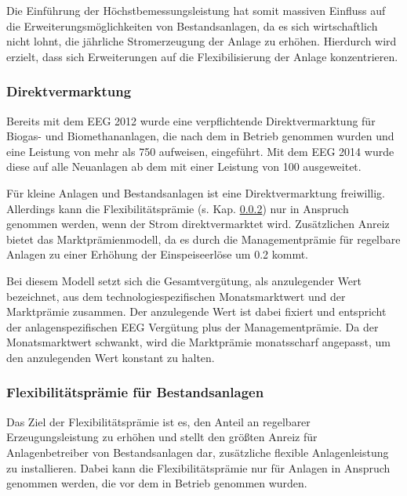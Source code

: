 Die Einführung der Höchstbemessungsleistung hat somit massiven Einfluss auf die Erweiterungsmöglichkeiten von Bestandsanlagen, da es sich wirtschaftlich nicht lohnt, die jährliche Stromerzeugung der Anlage zu erhöhen. Hierdurch wird erzielt, dass sich Erweiterungen auf die Flexibilisierung der Anlage konzentrieren. \parencite{DanielGromke2019}


\subsubsection{Direktvermarktung}\label{chap:law_DV}

Bereits mit dem \gls{EEG} \SI{2012}{\relax} wurde eine verpflichtende Direktvermarktung für Biogas- und Biomethananlagen, die nach dem  in Betrieb genommen wurden und eine Leistung von mehr als \SI{750}{\kw} aufweisen, eingeführt. Mit dem \gls{EEG} \SI{2014}{\relax} wurde diese auf alle Neuanlagen ab dem  mit einer Leistung von \SI{100}{\kw} ausgeweitet.\smallskip

Für kleine Anlagen und Bestandsanlagen ist eine Direktvermarktung freiwillig. Allerdings kann die Flexibilitätsprämie (s. Kap. \ref{chap:law_FP}) nur in Anspruch genommen werden, wenn der Strom direktvermarktet wird. Zusätzlichen Anreiz bietet das Marktprämienmodell, da es durch die Managementprämie für regelbare Anlagen zu einer Erhöhung der Einspeiseerlöse um \SI{0.2}{\ctkwh} kommt.\smallskip

Bei diesem Modell setzt sich die Gesamtvergütung, als anzulegender Wert bezeichnet, aus dem technologiespezifischen Monatsmarktwert und der Marktprämie zusammen. Der anzulegende Wert ist dabei fixiert und entspricht der anlagenspezifischen \gls{EEG} Vergütung plus der Managementprämie. Da der Monatsmarktwert schwankt, wird die Marktprämie monatsscharf angepasst, um den anzulegenden Wert konstant zu halten. \parencite{NKGH-DV}


\subsubsection{Flexibilitätsprämie für Bestandsanlagen}\label{chap:law_FP}

Das Ziel der Flexibilitätsprämie ist es, den Anteil an regelbarer Erzeugungsleistung zu erhöhen und stellt den größten Anreiz für Anlagenbetreiber von Bestandsanlagen dar, zusätzliche flexible Anlagenleistung zu installieren. Dabei kann die Flexibilitätsprämie nur für Anlagen in Anspruch genommen werden, die vor dem  in Betrieb genommen wurden.\smallskip

